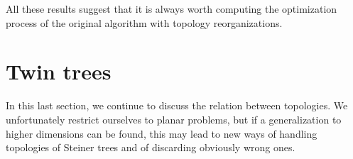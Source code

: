 \documentclass{article}
\theoremstyle{plain}
\begin{document}
All these results suggest that it is always worth computing the optimization process of the original algorithm with topology reorganizations.










\FloatBarrier

\section{Twin trees}
\label{sec:twintrees}
In this last section, we continue to discuss the relation between topologies.
We unfortunately restrict ourselves to planar problems, but if a generalization to higher dimensions can be found, this may lead to new ways of handling topologies of Steiner trees and of discarding obviously wrong ones.
\end{document}
